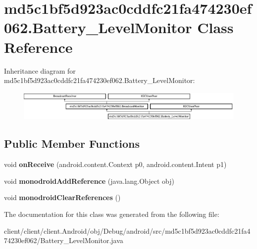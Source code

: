 \hypertarget{classmd5c1bf5d923ac0cddfc21fa474230ef062_1_1Battery__LevelMonitor}{}\section{md5c1bf5d923ac0cddfc21fa474230ef062.\+Battery\+\_\+\+Level\+Monitor Class Reference}
\label{classmd5c1bf5d923ac0cddfc21fa474230ef062_1_1Battery__LevelMonitor}
Inheritance diagram for md5c1bf5d923ac0cddfc21fa474230ef062.\+Battery\+\_\+\+Level\+Monitor\+:\begin{figure}[H]
\begin{center}
\leavevmode
\includegraphics[height=1.473684cm]{classmd5c1bf5d923ac0cddfc21fa474230ef062_1_1Battery__LevelMonitor}
\end{center}
\end{figure}
\subsection*{Public Member Functions}
\begin{DoxyCompactItemize}
\item 
\hypertarget{classmd5c1bf5d923ac0cddfc21fa474230ef062_1_1Battery__LevelMonitor_a83e986fb04ccc197601f34bab781c616}{}void {\bfseries on\+Receive} (android.\+content.\+Context p0, android.\+content.\+Intent p1)\label{classmd5c1bf5d923ac0cddfc21fa474230ef062_1_1Battery__LevelMonitor_a83e986fb04ccc197601f34bab781c616}

\item 
\hypertarget{classmd5c1bf5d923ac0cddfc21fa474230ef062_1_1Battery__LevelMonitor_a0c74ed72ec4b343931c2dc775a8280ca}{}void {\bfseries monodroid\+Add\+Reference} (java.\+lang.\+Object obj)\label{classmd5c1bf5d923ac0cddfc21fa474230ef062_1_1Battery__LevelMonitor_a0c74ed72ec4b343931c2dc775a8280ca}

\item 
\hypertarget{classmd5c1bf5d923ac0cddfc21fa474230ef062_1_1Battery__LevelMonitor_ae653707cb67cfbdab73e0d4092195e15}{}void {\bfseries monodroid\+Clear\+References} ()\label{classmd5c1bf5d923ac0cddfc21fa474230ef062_1_1Battery__LevelMonitor_ae653707cb67cfbdab73e0d4092195e15}

\end{DoxyCompactItemize}


The documentation for this class was generated from the following file\+:\begin{DoxyCompactItemize}
\item 
client/client/client.\+Android/obj/\+Debug/android/src/md5c1bf5d923ac0cddfc21fa474230ef062/Battery\+\_\+\+Level\+Monitor.\+java\end{DoxyCompactItemize}
